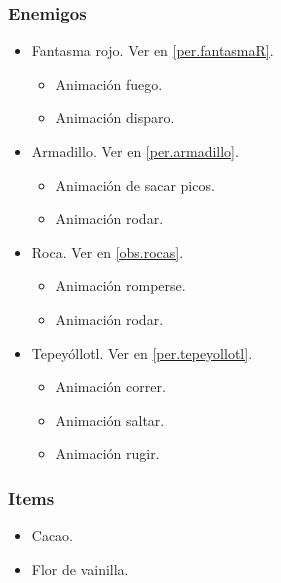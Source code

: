 \documentclass[11pt,letterpaper]{article}
\begin{document}
	\subsubsection{Enemigos}
\begin{itemize}
	\item 	Fantasma rojo. Ver en \ref{per.fantasmaR}.
		\begin{itemize}
				\item Animación fuego.
				\item Animación disparo.
			\end{itemize}
	\item Armadillo. Ver en \ref{per.armadillo}.
		\begin{itemize}
			\item Animación de sacar picos.
			\item Animación rodar. 
		\end{itemize}
	\item Roca. Ver en \ref{obs.rocas}.
		\begin{itemize}
			\item Animación romperse.
			\item Animación rodar.
		\end{itemize}
	\item Tepeyóllotl. Ver en \ref{per.tepeyollotl}. 
		\begin{itemize}
			\item Animación correr.
			\item Animación saltar.
			\item Animación rugir.
		\end{itemize}
\end{itemize}
	\subsubsection{Items}
\begin{itemize}
	\item 	Cacao.
	\item	Flor de vainilla.
\end{itemize}
\end{document}
